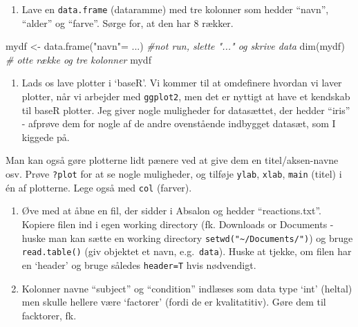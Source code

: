 \documentclass[
]{book}
\newenvironment{Shaded}{\begin{snugshade}}{\end{snugshade}}
\newcommand{\CommentTok}[1]{\textcolor[rgb]{0.56,0.35,0.01}{\textit{#1}}}
\newcommand{\FunctionTok}[1]{\textcolor[rgb]{0.00,0.00,0.00}{#1}}
\newcommand{\NormalTok}[1]{#1}
\newcommand{\OtherTok}[1]{\textcolor[rgb]{0.56,0.35,0.01}{#1}}
\newcommand{\SpecialCharTok}[1]{\textcolor[rgb]{0.00,0.00,0.00}{#1}}
\newcommand{\StringTok}[1]{\textcolor[rgb]{0.31,0.60,0.02}{#1}}
\providecommand{\tightlist}{%
  \setlength{\itemsep}{0pt}\setlength{\parskip}{0pt}}
\begin{document}
\begin{enumerate}
\def\labelenumi{\arabic{enumi})}
\setcounter{enumi}{3}
\tightlist
\item
  Lave en \texttt{data.frame} (dataramme) med tre kolonner som hedder ``navn'', ``alder'' og ``farve''. Sørge for, at den har 8 rækker.
\end{enumerate}

\begin{Shaded}
\begin{Highlighting}[]
\NormalTok{mydf }\OtherTok{\textless{}{-}} \FunctionTok{data.frame}\NormalTok{(}\StringTok{"navn"}\OtherTok{=}\NormalTok{ ...) }\CommentTok{\#not run, slette "..." og skrive data}
\FunctionTok{dim}\NormalTok{(mydf) }\CommentTok{\# otte række og tre kolonner}
\NormalTok{mydf}
\end{Highlighting}
\end{Shaded}

\begin{enumerate}
\def\labelenumi{\arabic{enumi})}
\setcounter{enumi}{4}
\tightlist
\item
  Lads os lave plotter i `baseR'. Vi kommer til at omdefinere hvordan vi laver plotter, når vi arbejder med \texttt{ggplot2}, men det er nyttigt at have et kendskab til baseR plotter. Jeg giver nogle muligheder for datasættet, der hedder ``iris'' - afprøve dem for nogle af de andre ovenstående indbygget datasæt, som I kiggede på.
\end{enumerate}

\begin{Shaded}
\end{Shaded}

Man kan også gøre plotterne lidt pænere ved at give dem en titel/aksen-navne osv. Prøve \texttt{?plot} for at se nogle muligheder, og tilføje \texttt{ylab}, \texttt{xlab}, \texttt{main} (titel) i én af plotterne. Lege også med \texttt{col} (farver).

\begin{enumerate}
\def\labelenumi{\arabic{enumi})}
\setcounter{enumi}{5}
\item
  Øve med at åbne en fil, der sidder i Absalon og hedder ``reactions.txt''. Kopiere filen ind i egen working directory (fk. Downloads or Documents - huske man kan sætte en working directory \texttt{setwd("\textasciitilde{}/Documents/")}) og bruge \texttt{read.table()} (giv objektet et navn, e.g.~\texttt{data}). Huske at tjekke, om filen har en `header' og bruge således \texttt{header=T} hvis nødvendigt.
\item
  Kolonner navne ``subject'' og ``condition'' indlæses som data type `int' (heltal) men skulle hellere være `factorer' (fordi de er kvalitatitiv). Gøre dem til facktorer, fk.
\end{enumerate}
\end{document}
